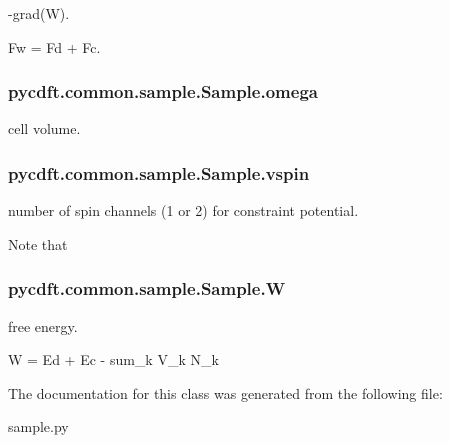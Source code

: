 -\/grad(W). 

Fw = Fd + Fc. \hypertarget{classpycdft_1_1common_1_1sample_1_1Sample_a49b2c758ad8f4cc0e5b30467c97fd863}{
\subsubsection[{omega}]{\setlength{\rightskip}{0pt plus 5cm}pycdft.\-common.\-sample.\-Sample.\-omega}}\label{classpycdft_1_1common_1_1sample_1_1Sample_a49b2c758ad8f4cc0e5b30467c97fd863}


cell volume. 

\hypertarget{classpycdft_1_1common_1_1sample_1_1Sample_a3fafb9053c6b3a3a99aca6ec6d74b0ef}{
\subsubsection[{vspin}]{\setlength{\rightskip}{0pt plus 5cm}pycdft.\-common.\-sample.\-Sample.\-vspin}}\label{classpycdft_1_1common_1_1sample_1_1Sample_a3fafb9053c6b3a3a99aca6ec6d74b0ef}


number of spin channels (1 or 2) for constraint potential. 

Note that \hypertarget{classpycdft_1_1common_1_1sample_1_1Sample_a54c37016030864effcd67f63f38b8387}{
\subsubsection[{W}]{\setlength{\rightskip}{0pt plus 5cm}pycdft.\-common.\-sample.\-Sample.\-W}}\label{classpycdft_1_1common_1_1sample_1_1Sample_a54c37016030864effcd67f63f38b8387}


free energy. 

W = Ed + Ec -\/ sum\-\_\-k V\-\_\-k N\-\_\-k 

The documentation for this class was generated from the following file\-:\begin{DoxyCompactItemize}
\item 
sample.\-py\end{DoxyCompactItemize}
